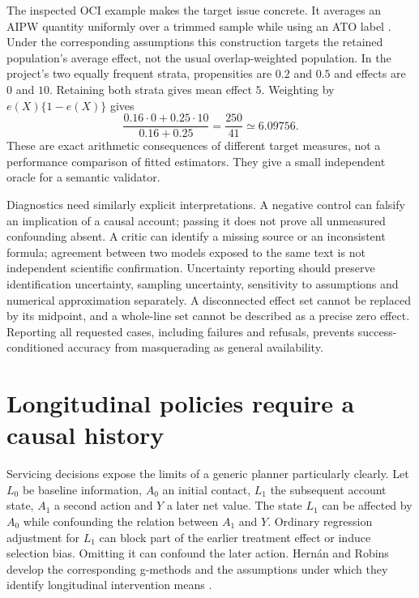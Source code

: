The inspected OCI example makes the target issue concrete. It averages an AIPW
quantity uniformly over a trimmed sample while using an ATO label
\citep{v12_la_package_oci_agent}. Under the corresponding assumptions this
construction targets the retained population's average effect, not the usual
overlap-weighted population. In the project's two equally frequent strata,
propensities are $0.2$ and $0.5$ and effects are $0$ and $10$. Retaining both
strata gives mean effect $5$. Weighting by $e(X)\{1-e(X)\}$ gives
\[
 \frac{0.16\cdot0+0.25\cdot10}{0.16+0.25}
 =\frac{250}{41}\simeq6.09756.
\]
These are exact arithmetic consequences of different target measures, not a
performance comparison of fitted estimators. They give a small independent
oracle for a semantic validator.

Diagnostics need similarly explicit interpretations. A negative control can
falsify an implication of a causal account; passing it does not prove all
unmeasured confounding absent. A critic can identify a missing source or an
inconsistent formula; agreement between two models exposed to the same text is
not independent scientific confirmation. Uncertainty reporting should preserve
identification uncertainty, sampling uncertainty, sensitivity to assumptions
and numerical approximation separately. A disconnected effect set cannot be
replaced by its midpoint, and a whole-line set cannot be described as a precise
zero effect. Reporting all requested cases, including failures and refusals,
prevents success-conditioned accuracy from masquerading as general availability.

\section{Longitudinal policies require a causal history}

Servicing decisions expose the limits of a generic planner particularly clearly.
Let $L_0$ be baseline information, $A_0$ an initial contact, $L_1$ the subsequent
account state, $A_1$ a second action and $Y$ a later net value. The state $L_1$ can
be affected by $A_0$ while confounding the relation between $A_1$ and $Y$.
Ordinary regression adjustment for $L_1$ can block part of the earlier treatment
effect or induce selection bias. Omitting it can confound the later action.
Hernán and Robins develop the corresponding g-methods and the assumptions under
which they identify longitudinal intervention means \citep{hernan2020}.

